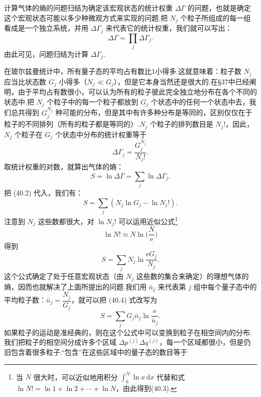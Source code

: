 计算气体的熵的问题归结为确定该宏观状态的统计权重 $\Delta\Gamma$ 的问题，也就是确定这个宏观状态可能以多少种微观方式来实现的问题.把 $N_j$ 个粒子所组成的每一组看成是一个独立系统，并用 $\Delta\Gamma_j$ 来代表它的统计权重，我们就可以写出：
\begin{equation}
  \Delta\Gamma=\prod_j\Delta\Gamma_j.
\end{equation}
由此可见，问题归结为计算 $\Delta\Gamma_j$.

在玻尔兹曼统计中，所有量子态的平均占有数比1小得多.这就意味着：粒子数 $N_j$ 应当比状态数 $G_j$ 小得多（$N_j\ll G_j$），但是它本身当然还是很大的.在§37中已经阐明，由于平均占有数很小，可以认为所有的粒子彼此完全独立地分布在各个不同的状态中.把 $N_j$ 个粒子中的每一个粒子都放到 $G_j$ 个状态中的任何一个状态中去，我们总共得到 $G_j^{N_j}$ 种可能的分布，但是其中有许多种分布是等同的，区别仅仅在于粒子的不同排列（所有的粒子都是等同的）.$N_j$ 个粒子的排列数目是 $N_j!$，因此，$N_j$ 个粒子在 $G_j$ 个状态中分布的统计权重等于
\begin{equation}
  \Delta\Gamma_j=\frac{G_j^{N_j}}{N_j!}.
\end{equation}
取统计权重的对数，就算出气体的熵：
\begin{equation*}
  S=\ln\Delta\Gamma=\sum_j\ln\Delta\Gamma_j.
\end{equation*}
把 (40.2) 代入，我们有：
\begin{equation*}
  S=\sum_j\left(N_j\ln G_j-\ln N_j!\right).
\end{equation*}
注意到 $N_j$ 这些数都很大，对 $\ln N_j!$ 可以运用近似公式\footnote{当 $N$ 很大时，可以近似地用积分 $\int_0^N\ln x\,\mathrm{d}x$ 代替和式 $\ln N!=\ln1+\ln2+\cdots+\ln N$，由此得到(40.3).}
\begin{equation}
  \ln N!\approx N\ln\Big(\frac{N}{\mathrm{e}}\Big)
\end{equation}
得到
\begin{equation}
  S=\sum_j N_j\ln\frac{\mathrm{e}G_j}{N_j}.
\end{equation}
这个公式确定了处于任意宏观状态（由 $N_j$ 这些数的集合来确定）的理想气体的熵，因而也就解决了上面所提出的问题.我们用 $\bar{n}_j$ 来代表第 $j$ 组中每个量子态中的平均粒子数：$\bar{n}_j=\dfrac{N_j}{G_j}$，就可以把 (40.4) 式改写为
\begin{equation}
  S=\sum_j G_j\bar{n}_j\ln\frac{\mathrm{e}}{\bar{n}_j}.
\end{equation}
如果粒子的运动是准经典的，则在这个公式中可以变换到粒子在相空间内的分布.我们把粒子的相空间分成许多个区域 $\Delta p^{(j)}\Delta q^{(j)}$，每一个区域都很小，但是仍旧包含着很多粒子.“包含”在这些区域中的量子态的数目等于
